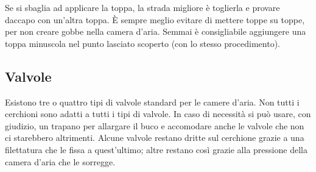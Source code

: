 Se si sbaglia ad applicare la toppa, la strada migliore è toglierla e provare daccapo con un'altra toppa.
È sempre meglio evitare di mettere toppe su toppe, per non creare gobbe nella camera d'aria.
Semmai è consigliabile aggiungere una toppa minuscola nel punto lasciato scoperto (con lo stesso procedimento).

\subsection*{Valvole}
Esistono tre o quattro tipi di valvole standard per le camere d'aria.
Non tutti i cerchioni sono adatti a tutti i tipi di valvole.
In caso di necessità si può usare, con giudizio, un trapano per allargare il buco e accomodare anche le valvole che non ci starebbero altrimenti.
Alcune valvole restano dritte sul cerchione grazie a una filettatura che le fissa a quest'ultimo; altre restano così grazie alla pressione della camera d'aria che le sorregge.
